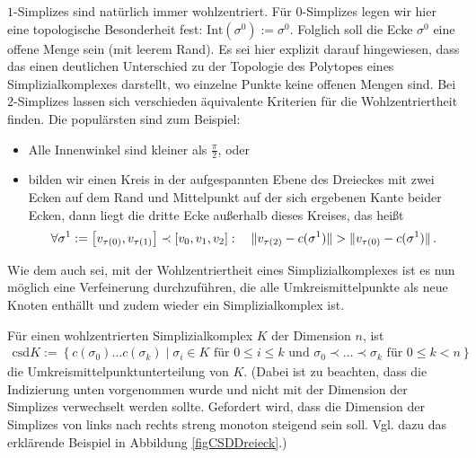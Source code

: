     \( 1 \)-Simplizes sind natürlich immer wohlzentriert. 
    Für \( 0 \)-Simplizes legen wir hier eine topologische Besonderheit fest: \(\text{Int}(\sigma^{0}) := \sigma^{0}\).
    Folglich soll die Ecke \( \sigma^{0} \) eine offene Menge sein (mit leerem Rand).
    Es sei hier explizit darauf hingewiesen, dass das einen deutlichen Unterschied zu der Topologie des Polytopes eines Simplizialkomplexes darstellt,
    wo einzelne Punkte keine offenen Mengen sind.
    Bei \( 2 \)-Simplizes lassen sich verschieden äquivalente Kriterien für die Wohlzentriertheit finden.
    Die populärsten sind zum Beispiel:
    \begin{itemize}
      \item Alle Innenwinkel sind kleiner als \( \frac{\pi}{2} \), oder
      \item bilden wir einen Kreis in der aufgespannten Ebene des Dreieckes mit zwei Ecken auf dem Rand und Mittelpunkt auf der sich ergebenen Kante beider Ecken, 
      dann liegt die dritte Ecke außerhalb dieses Kreises, das heißt
        \begin{align}
          \forall \sigma^{1} := \left[ v_{\tau(0)},v_{\tau(1)}\right] \prec \left[v_{0},v_{1},v_{2}\right]:\quad \|v_{\tau(2)} - c(\sigma^{1})\| > \|v_{\tau(0)} - c(\sigma^{1})\|
          \,\text{.}
        \end{align}
    \end{itemize}
    Wie dem auch sei, mit der Wohlzentriertheit eines Simplizialkomplexes ist es nun möglich eine Verfeinerung durchzuführen, die alle Umkreismittelpunkte als neue Knoten enthällt und zudem
    wieder ein Simplizialkomplex ist.

    \begin{definition}
      Für einen wohlzentrierten Simplizialkomplex \( K \) der Dimension \( n \), ist
      \begin{align}
        \text{csd}K := \left\{ c(\sigma_{0}) \ldots c(\sigma_{k}) \middle| \sigma_{i}\in K \text { für } 0 \le i \le k \text{ und }
                                                                          \sigma_{0} \prec \ldots \prec \sigma_{k} \text { für } 0 \le k < n \right\}
      \end{align}
      die Umkreismittelpunktunterteilung von \( K \).
      (Dabei ist zu beachten, dass die Indizierung unten vorgenommen wurde und nicht mit der Dimension der Simplizes verwechselt werden
      sollte. Gefordert wird, dass die Dimension der Simplizes von links nach rechts streng monoton steigend sein soll. 
      Vgl. dazu das erklärende Beispiel in Abbildung \ref{figCSDDreieck}.)
    \end{definition}

